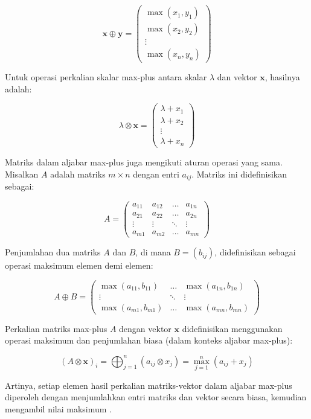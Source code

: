 \documentclass{file/TA-ITS}
\theoremstyle{definition}
\theoremstyle{definition}
\theoremstyle{plain}
\begin{document}
\[
\mathbf{x} \oplus \mathbf{y} = \begin{pmatrix} \max(x_1, y_1) \\ \max(x_2, y_2) \\ \vdots \\ \max(x_n, y_n) \end{pmatrix}
\]

Untuk operasi perkalian skalar max-plus antara skalar \( \lambda \) dan vektor \( \mathbf{x} \), hasilnya adalah:

\[
\lambda \otimes \mathbf{x} = \begin{pmatrix} \lambda + x_1 \\ \lambda + x_2 \\ \vdots \\ \lambda + x_n \end{pmatrix}
\]

Matriks dalam aljabar max-plus juga mengikuti aturan operasi yang sama. Misalkan \( A \) adalah matriks \( m \times n \) dengan entri \( a_{ij} \). Matriks ini didefinisikan sebagai:

\[
A = \begin{pmatrix} a_{11} & a_{12} & \dots & a_{1n} \\ a_{21} & a_{22} & \dots & a_{2n} \\ \vdots & \vdots & \ddots & \vdots \\ a_{m1} & a_{m2} & \dots & a_{mn} \end{pmatrix}
\]

Penjumlahan dua matriks \( A \) dan \( B \), di mana \( B = (b_{ij}) \), didefinisikan sebagai operasi maksimum elemen demi elemen:

\[
A \oplus B = \begin{pmatrix} \max(a_{11}, b_{11}) & \dots & \max(a_{1n}, b_{1n}) \\ \vdots & \ddots & \vdots \\ \max(a_{m1}, b_{m1}) & \dots & \max(a_{mn}, b_{mn}) \end{pmatrix}
\]

Perkalian matriks max-plus \( A \) dengan vektor \( \mathbf{x} \) didefinisikan menggunakan operasi maksimum dan penjumlahan biasa (dalam konteks aljabar max-plus):

\[
(A \otimes \mathbf{x})_i = \bigoplus_{j=1}^n (a_{ij} \otimes x_j) = \max_{j=1}^n (a_{ij} + x_j)
\]

Artinya, setiap elemen hasil perkalian matriks-vektor dalam aljabar max-plus diperoleh dengan menjumlahkan entri matriks dan vektor secara biasa, kemudian mengambil nilai maksimum \cite{subionopower}.
\end{document}
